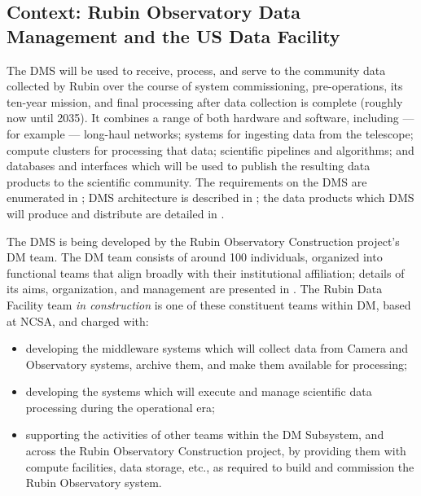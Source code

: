 \subsection{Context: Rubin Observatory \gls{Data Management} and the \gls{US} Data Facility}
\label{sec:intro:context}

The \gls{DMS} will be used to receive, process, and serve to the community data collected by Rubin over the course of system commissioning, pre-operations, its ten-year mission, and final processing after \gls{data collection} is complete (roughly now until 2035).
It combines a range of both hardware and software, including --- for example --- long-haul networks; systems for ingesting data from the telescope; compute clusters for
processing that data; scientific pipelines and algorithms; and databases and interfaces which will be used to publish the resulting data products to the scientific community.
The requirements on the \gls{DMS} are enumerated in ; \gls{DMS} architecture is described in ; the data products which \gls{DMS} will produce and distribute are detailed in .

The \gls{DMS} is being developed by the Rubin Observatory \gls{Construction} project's \gls{DM} team.
The \gls{DM} team consists of around 100 individuals, organized into functional teams that align broadly with their institutional affiliation; details of its aims, organization, and management are presented in .
The Rubin Data Facility team \emph{in construction} is one of these constituent teams within \gls{DM}, based at \gls{NCSA}, and charged with:

\begin{itemize}

\item{developing the \gls{middleware} systems which will collect data from \gls{Camera} and Observatory systems, archive them, and make them available for processing;}
\item{developing the systems which will execute and manage scientific data processing during the operational era;}
\item{supporting the activities of other teams within the \gls{DM} \gls{Subsystem}, and across the Rubin Observatory \gls{Construction} project, by providing them with compute facilities, data storage, etc., as required to build and commission the Rubin Observatory system.}

\end{itemize}

